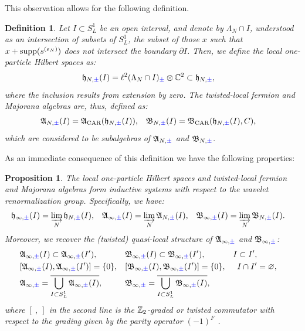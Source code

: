 \documentclass[a4paper, 11pt]{article}
\renewcommand{\emptyset}{\varnothing}
\newcommand{\fA}{\mathfrak{A}}\newcommand{\cA}{\mathcal{A}}\newcommand{\dA}{\mathds{A}}\newcommand{\sA}{\mathscr{A}}
\newcommand{\fB}{\mathfrak{B}}\newcommand{\cB}{\mathcal{B}}\newcommand{\dB}{\mathds{B}}\newcommand{\sB}{\mathscr{B}}
\newcommand{\fh}{\mathfrak{h}}
\newcommand{\ltwo}{\ell^{2}}
\DeclareMathOperator{\1}{\mathds{1}}
\DeclareMathOperator{\supp}{supp}
\DeclareMathOperator{\CAR}{\textup{CAR}}
\newtheorem{prop}[thm]{Proposition}
\newtheorem{defn}[thm]{Definition}
\begin{document}
This observation allows for the following definition.
\begin{defn}
\label{def:antiloc}
Let $I\subset S^{1}_{L}$ be an open interval, and denote by $\Lambda_{N}\cap I$, understood as an intersection of subsets of $S^{1}_{L}$, the subset of those $x$ such that $x+\supp(s^{(\vep_{N})})$ does not intersect the boundary $\partial I$. Then, we define the \emph{local one-particle Hilbert spaces} as:
\begin{align*}
\fh_{N,{\color{blue}\pm}}(I) & = \ltwo(\Lambda_{N}\cap I)_{{\color{blue}\pm}}\otimes\C^{2}\subset\fh_{N,{\color{blue}\pm}},
\end{align*}
where the inclusion results from extension by zero. The \emph{twisted-local fermion and Majorana algebras} are, thus, defined as:
\begin{align*}
\fA_{N,{\color{blue}\pm}}(I) & = \fA_{\CAR}(\fh_{N,{\color{blue}\pm}}(I)), & \fB_{N,{\color{blue}\pm}}(I) & = \fB_{\CAR}(\fh_{N,{\color{blue}\pm}}(I),C),
\end{align*}
which are considered to be subalgebras of $\fA_{N,{\color{blue}\pm}}$ and $\fB_{N,{\color{blue}\pm}}$.
\end{defn}
As an immediate consequence of this definition we have the following properties:
\begin{prop}
\label{prop:antilocal}
The local one-particle Hilbert spaces and twisted-local fermion and Majorana algebras form inductive systems with respect to the wavelet renormalization group. Specifically, we have:
\begin{align*}
\fh_{\infty,{\color{blue}\pm}}(I) & = \varinjlim_{N}\fh_{N,{\color{blue}\pm}}(I), & \fA_{\infty,{\color{blue}\pm}}(I) & = \varinjlim_{N}\fA_{N,{\color{blue}\pm}}(I), & \fB_{\infty,{\color{blue}\pm}}(I) & = \varinjlim_{N}\fB_{N,{\color{blue}\pm}}(I).
\end{align*}
Moreover, we recover the (twisted) quasi-local structure of $\fA_{\infty,{\color{blue}\pm}}$ and $\fB_{\infty,{\color{blue}\pm}}$:
\begin{align*}
& \fA_{\infty,{\color{blue}\pm}}(I)\subset\fA_{\infty,{\color{blue}\pm}}(I'), &  & \fB_{\infty,{\color{blue}\pm}}(I)\subset\fB_{\infty,{\color{blue}\pm}}(I'), & I\subset I', \\
& [\fA_{\infty,{\color{blue}\pm}}(I),\fA_{\infty,{\color{blue}\pm}}(I')] = \{0\}, &  & [\fB_{\infty,{\color{blue}\pm}}(I),\fB_{\infty,{\color{blue}\pm}}(I')] = \{0\}, & I\cap I' & = \emptyset, \\
& \fA_{\infty,{\color{blue}\pm}} = \overline{\bigcup_{I\subset S^{1}_{L}}\fA_{\infty,{\color{blue}\pm}}(I)}, &  & \fB_{\infty,{\color{blue}\pm}} = \overline{\bigcup_{I\subset S^{1}_{L}}\fB_{\infty,{\color{blue}\pm}}(I)},
\end{align*}
where $[\!\ ,\!\ ]$ in the second line is the $\mathbb{Z}_{2}$-graded or twisted commutator with respect to the grading given by the parity operator $(-1)^{F}$ \cite{BratteliOperatorAlgebrasAnd1}.
\end{prop}
\end{document}
